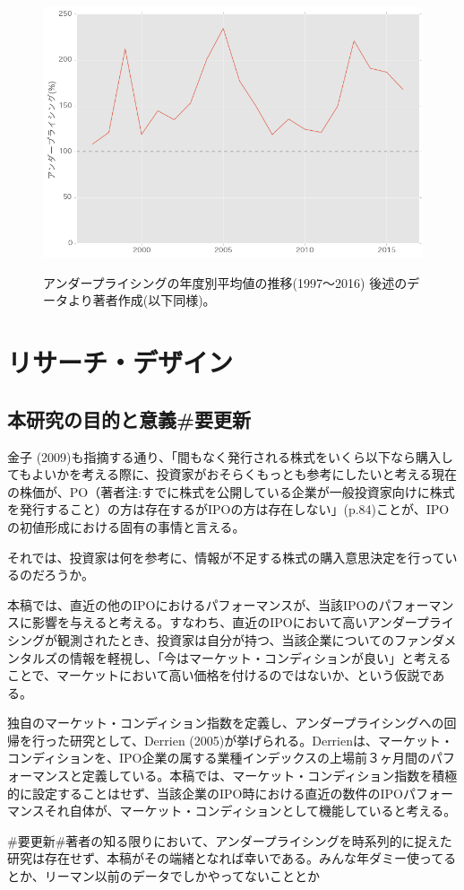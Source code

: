 \documentclass{jsarticle}
\begin{document}
\begin{figure}[h]
  \begin{center}
  \caption{アンダープライシングの年度別平均値の推移(1997〜2016) 後述のデータより著者作成(以下同様)。}
    \includegraphics[clip,width=14cm]{./transition.png}
    \label{transition}
  \end{center}
\end{figure}


\section{リサーチ・デザイン}
\subsection{本研究の目的と意義\#要更新}
金子 (2009)\cite{kaneko}も指摘する通り、「間もなく発行される株式をいくら以下なら購入してもよいかを考える際に、投資家がおそらくもっとも参考にしたいと考える現在の株価が、PO（著者注:すでに株式を公開している企業が一般投資家向けに株式を発行すること）の方は存在するがIPOの方は存在しない」(p.84)ことが、IPOの初値形成における固有の事情と言える。\par
それでは、投資家は何を参考に、情報が不足する株式の購入意思決定を行っているのだろうか。\par
本稿では、直近の他のIPOにおけるパフォーマンスが、当該IPOのパフォーマンスに影響を与えると考える。すなわち、直近のIPOにおいて高いアンダープライシングが観測されたとき、投資家は自分が持つ、当該企業についてのファンダメンタルズの情報を軽視し、「今はマーケット・コンディションが良い」と考えることで、マーケットにおいて高い価格を付けるのではないか、という仮説である。\par
独自のマーケット・コンディション指数を定義し、アンダープライシングへの回帰を行った研究として、Derrien (2005)\cite{Derrien}が挙げられる。Derrienは、マーケット・コンディションを、IPO企業の属する業種インデックスの上場前３ヶ月間のパフォーマンスと定義している。本稿では、マーケット・コンディション指数を積極的に設定することはせず、当該企業のIPO時における直近の数件のIPOパフォーマンスそれ自体が、マーケット・コンディションとして機能していると考える。\par
\#要更新\#著者の知る限りにおいて、アンダープライシングを時系列的に捉えた研究は存在せず、本稿がその端緒となれば幸いである。みんな年ダミー使ってるとか、リーマン以前のデータでしかやってないこととか\par
\end{document}
